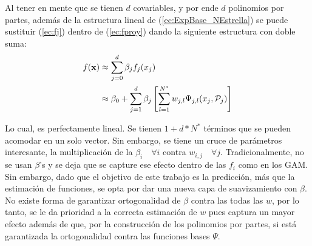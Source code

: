 \documentclass[../Main/Main.tex]{subfiles}
\begin{document}
Al tener en mente que se tienen $d$ covariables, y por ende $d$ polinomios por partes, además de la estructura lineal de (\ref{ec:ExpBase_NEstrella}) se puede sustituir (\ref{ec:fj}) dentro de (\ref{ec:fproy}) dando la siguiente estructura con doble suma:
\begin{align*}
	f(\mathbf{x}) &\approx \sum_{j=0}^d \beta_j f_j(x_j) \\
			&\approx \beta_0 + \sum_{j=1}^d \beta_j \left[\sum_{l=1}^{N^*} w_{j,l}\Psi_{j,l}(x_j, \mathcal{P}_j)\right]
\end{align*}

Lo cual, es perfectamente lineal. Se tienen $1 + d*N^*$ términos que se pueden acomodar en un solo vector. Sin embargo, se tiene un cruce de parámetros interesante, la multiplicación de la $\beta_i\quad \forall i$ contra $w_{i,j} \quad \forall j$. Tradicionalmente, no se usan $\beta$'s y se deja que se capture ese efecto dentro de las $f_i$ como en los GAM. Sin embargo, dado que el objetivo de este trabajo es la predicción, más que la estimación de funciones, se opta por dar una nueva capa de suavizamiento con $\beta$. No existe forma de garantizar ortogonalidad de $\beta$ contra las todas las $w$, por lo tanto, se le da prioridad a la correcta estimación de $w$ pues captura un mayor efecto además de que, por la construcción de los polinomios por partes, si está garantizada la ortogonalidad contra las funciones bases $\Psi$.
\end{document}

